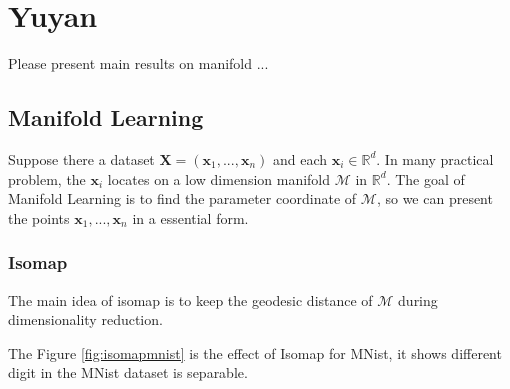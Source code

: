 \section{Yuyan}

Please present main results on manifold ...

\subsection{Manifold Learning}
Suppose there a dataset $\mathbf X =(\mathbf x_1,...,\mathbf x_n)$ and each $\mathbf x_i\in \mathbb R^d$. In many  practical problem, the $\mathbf x_i$ locates on a low dimension manifold $\mathcal M$ in $\mathbb R^d$. The goal of Manifold Learning is to find the parameter coordinate of $\mathcal M$, so we can present the points $\mathbf x_1,...,\mathbf x_n$ in a essential form.
\subsubsection{Isomap}
The main idea of isomap is to keep the geodesic distance of $\mathcal M$ during dimensionality reduction.


The Figure \ref{fig:isomapmnist} is the effect of Isomap for MNist, it shows different digit in the MNist dataset is separable.
